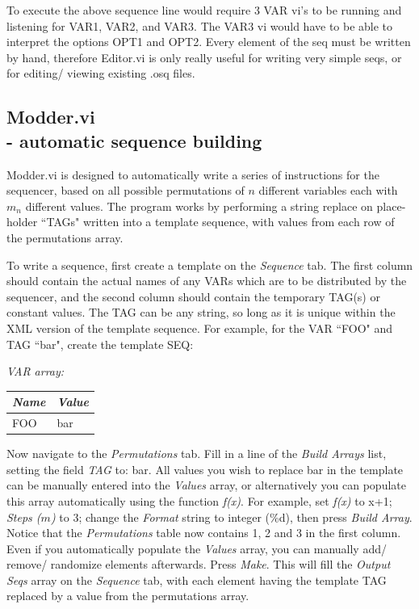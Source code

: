 \documentclass[10pt,a4paper]{article}
\begin{document}
To execute the above sequence line would require 3 VAR vi's to be running and listening for VAR1, VAR2, and VAR3.  The VAR3 vi would have to be able to interpret the options OPT1 and OPT2.  Every element of the seq must be written by hand, therefore Editor.vi is only really useful for writing very simple seqs, or for editing/ viewing existing .osq files.

\subsection[Modder.vi]{\label{sex:modder}Modder.vi \\ %
	\normalsize - automatic sequence building}

Modder.vi is designed to automatically write a series of instructions for the sequencer, based on all possible permutations of $n$ different variables each with $m_n$ different values.  The program works by performing a string replace on place-holder ``TAGs" written into a template sequence, with values from each row of the permutations array.  

To write a sequence, first create a template on the \emph{Sequence} tab.  The first column should contain the actual names of any VARs which are to be distributed by the sequencer, and the second column should contain the temporary TAG(s) or constant values.  The TAG can be any string, so long as it is unique within the XML version of the template sequence.  For example, for the VAR ``FOO" and TAG ``bar", create the template SEQ:

\hangindent=0.7cm
\emph{VAR array:} \\
\begin{tabularx}{0.3\textwidth}{X|X}
	\emph{Name} & \emph{Value} \\
	\hline
	FOO & bar \\
\end{tabularx}
\vspace{3mm}

Now navigate to the \emph{Permutations} tab.  Fill in a line of the \emph{Build Arrays} list, setting the field \emph{TAG} to: bar.  All values you wish to replace bar in the template can be manually entered into the \emph{Values} array, or alternatively you can populate this array automatically using the function \emph{f(x)}.  For example, set \emph{f(x)} to x+1; \emph{Steps ($m$)} to 3; change the \emph{Format} string to integer (\%d), then press \emph{Build Array}.  Notice that the \emph{Permutations} table now contains 1, 2 and 3 in the first column.  Even if you automatically populate the \emph{Values} array, you can manually add/ remove/ randomize elements afterwards. Press \emph{Make}.  This will fill the \emph{Output Seqs} array on the \emph{Sequence} tab, with each element having the template TAG replaced by a value from the permutations array.
\end{document}
